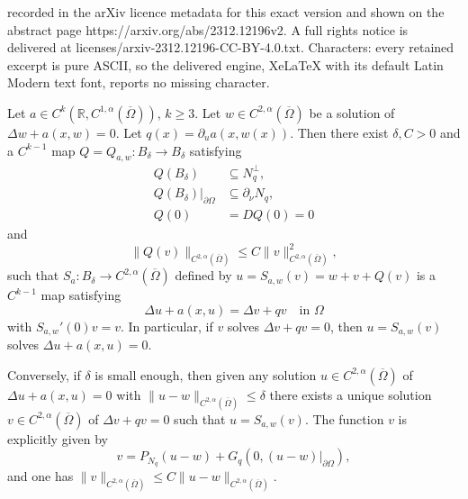 \documentclass[10pt,a4paper]{amsart}
\newcommand{\Om}{\Omega}
\newcommand{\mR}{\mathbb{R}}                    %
\newcommand{\norm}[1]{\lVert #1 \rVert}         %
\newcommand{\ol}[1]{\overline{#1}}
\newcommand{\p}{\partial}
\begin{document}
recorded in the arXiv licence metadata for this exact version and shown on the abstract page https://arxiv.org/abs/2312.12196v2. A full rights notice is delivered at licenses/arxiv-2312.12196-CC-BY-4.0.txt. Characters: every retained excerpt is pure ASCII, so the delivered engine, XeLaTeX with its default Latin Modern text font, reports no missing character.
\begin{Lemma} \label{lemma_perturbed_sol}
Let $a \in C^{k}(\mR, C^{1,\alpha}(\ol{\Om}))$, $k \geq 3$.
Let $w \in C^{2,\alpha}(\ol{\Omega})$ be a solution of $\Delta w + a(x,w) = 0$.
Let $q(x) = \p_u a(x,w(x))$.
Then there exist $\delta, C > 0$ and a $C^{k-1}$ map $Q = Q_{a,w}: B_{\delta} \to B_{\delta}$ satisfying 
\begin{align*}
Q(B_{\delta}) &\subseteq N_q^{\perp}, \\
Q(B_{\delta})|_{\p \Omega} &\subseteq \p_{\nu} N_q, \\
Q(0) &= DQ(0) = 0
\end{align*}
and
\begin{equation}\label{lemma_estimate_r}
    \norm{Q(v)}_{C^{2,\alpha}(\ol{\Omega})}\leq C\norm{v}_{C^{2,\alpha}(\ol{\Omega})}^2,
\end{equation}
such that \( S_{a}\colon B_{\delta}\to C^{2,\alpha}(\ol{\Omega}) \) defined by \( u = S_{a,w}(v) = w + v + Q(v) \) is a \( C^{k-1} \) map satisfying 
\begin{equation} \label{u_v_eq}
	\Delta u + a(x,u) = \Delta v + q v \quad\text{in }\Omega
\end{equation}
with \( S_{a,w}'(0)v = v \). In particular, if $v$ solves $\Delta v + qv = 0$, then $u = S_{a,w}(v)$ solves $\Delta u + a(x,u) = 0$.

Conversely, if $\delta$ is small enough, then given any solution $u \in C^{2,\alpha}(\ol{\Omega})$ of $\Delta u + a(x,u) = 0$ with $\norm{u-w}_{C^{2,\alpha}(\ol{\Omega})} \leq \delta$ there exists a unique solution $v \in C^{2,\alpha}(\ol{\Omega})$ of $\Delta v + qv = 0$ such that $u = S_{a,w}(v)$. The function $v$ is explicitly given by 
\begin{equation} \label{u_v_converse}
v = P_{N_q}(u-w) + G_q(0, (u-w)|_{\p \Omega}),
\end{equation}
and one has $\norm{v}_{C^{2,\alpha}(\ol{\Omega})} \leq C \norm{u-w}_{C^{2,\alpha}(\ol{\Omega})}$.
\end{Lemma}
\end{document}
